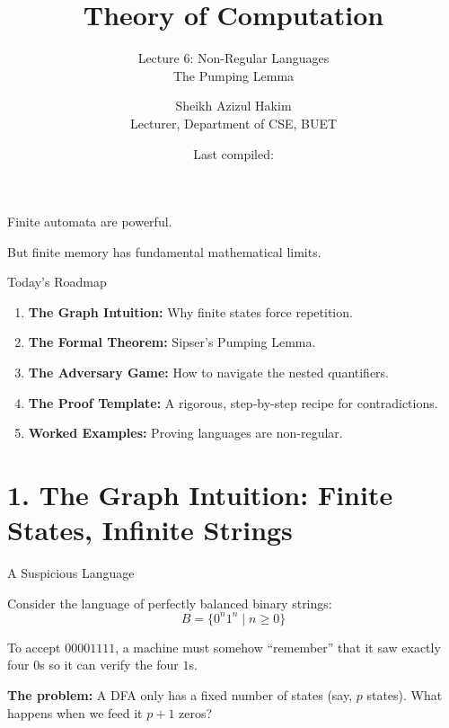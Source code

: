 \documentclass[10pt,aspectratio=169]{beamer}
\title{Theory of Computation}
\subtitle{Lecture 6: Non-Regular Languages\\The Pumping Lemma}
\author{Sheikh Azizul Hakim\\Lecturer, Department of CSE, BUET}
\date{Last compiled: \LastCompiled}
\begin{document}
\maketitle

\begin{frame}[standout]
Finite automata are powerful.

But finite memory has fundamental mathematical limits.
\end{frame}

\begin{frame}{Today's Roadmap}
\begin{enumerate}
    \item \textbf{The Graph Intuition:} Why finite states force repetition.
    \item \textbf{The Formal Theorem:} Sipser's Pumping Lemma.
    \item \textbf{The Adversary Game:} How to navigate the nested quantifiers.
    \item \textbf{The Proof Template:} A rigorous, step-by-step recipe for contradictions.
    \item \textbf{Worked Examples:} Proving languages are non-regular.
\end{enumerate}
\end{frame}

\section{1. The Graph Intuition: Finite States, Infinite Strings}

\begin{frame}{A Suspicious Language}

Consider the language of perfectly balanced binary strings:
\[
B = \{0^n1^n \mid n \geq 0\}
\]

\vspace{0.8em}
To accept $00001111$, a machine must somehow ``remember'' that it saw exactly four $0$s so it can verify the four $1$s.

\vspace{0.8em}
\textbf{The problem:} A DFA only has a fixed number of states (say, $p$ states). What happens when we feed it $p+1$ zeros?

\end{frame}
\end{document}
